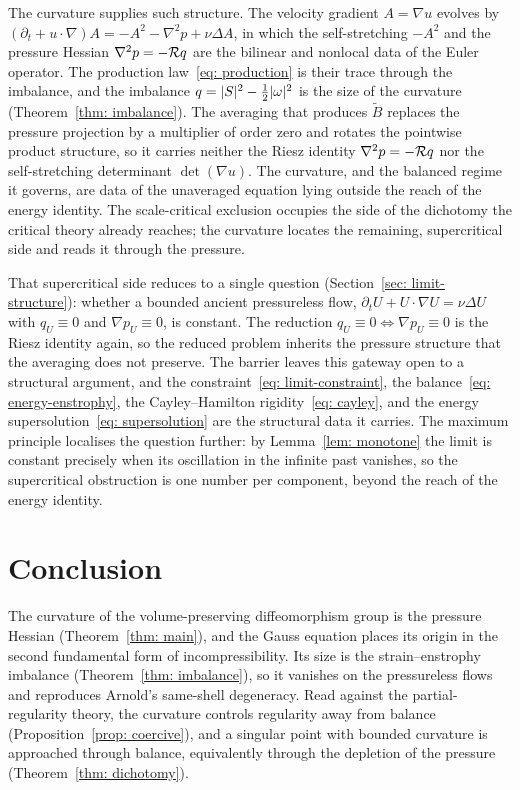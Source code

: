 The curvature supplies such structure. The velocity gradient $A = \nabla u$ evolves
by $(\partial_t + u\cdot\nabla)A = -A^2 - \nabla^2 p + \nu\Delta A$, in which the
self-stretching $-A^2$ and the pressure Hessian $\nabla^2 p = -\mathcal{R} q$ are the
bilinear and nonlocal data of the Euler operator. The production
law~\eqref{eq: production} is their trace through the imbalance, and the imbalance
$q = \lvert S \rvert^2 - \tfrac12\lvert \omega \rvert^2$ is the size of the curvature
(Theorem~\ref{thm: imbalance}). The averaging that produces $\tilde B$ replaces the
pressure projection by a multiplier of order zero and rotates the pointwise product
structure, so it carries neither the Riesz identity $\nabla^2 p = -\mathcal{R} q$ nor the
self-stretching determinant $\det(\nabla u)$. The curvature, and the balanced regime
it governs, are data of the unaveraged equation lying outside the reach of the energy
identity. The scale-critical exclusion occupies the side of the dichotomy the
critical theory already reaches; the curvature locates the remaining, supercritical
side and reads it through the pressure.

That supercritical side reduces to a single question
(Section~\ref{sec: limit-structure}): whether a bounded ancient pressureless flow,
$\partial_t U + U\cdot\nabla U = \nu\Delta U$ with $q_U\equiv0$ and
$\nabla p_U\equiv0$, is constant. The reduction
$q_U\equiv0 \Leftrightarrow \nabla p_U\equiv0$ is the Riesz identity again, so the
reduced problem inherits the pressure structure that the averaging does not
preserve. The barrier leaves this gateway open to a structural argument, and the
constraint~\eqref{eq: limit-constraint}, the balance~\eqref{eq: energy-enstrophy},
the Cayley--Hamilton rigidity~\eqref{eq: cayley}, and the energy
supersolution~\eqref{eq: supersolution} are the structural data it carries. The
maximum principle localises the question further: by Lemma~\ref{lem: monotone} the
limit is constant precisely when its oscillation in the infinite past vanishes, so
the supercritical obstruction is one number per component, beyond the reach of the
energy identity.

\section{Conclusion}
\label{sec: conclusion}

The curvature of the volume-preserving diffeomorphism group is the pressure
Hessian (Theorem~\ref{thm: main}), and the Gauss equation places its origin in
the second fundamental form of incompressibility. Its size is the
strain--enstrophy imbalance (Theorem~\ref{thm: imbalance}), so it vanishes on the
pressureless flows and reproduces Arnold's same-shell degeneracy. Read against the
partial-regularity theory, the curvature controls regularity away from balance
(Proposition~\ref{prop: coercive}), and a singular point with bounded curvature is
approached through balance, equivalently through the depletion of the pressure
(Theorem~\ref{thm: dichotomy}).

